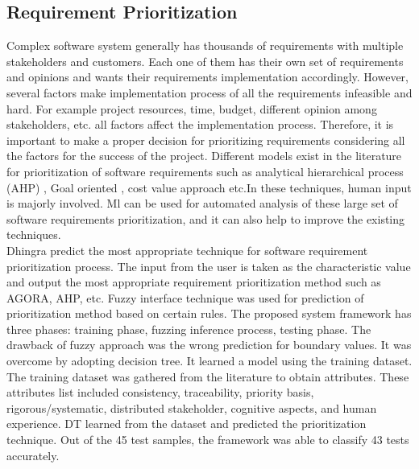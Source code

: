 \subsection{Requirement Prioritization}
Complex software system generally has thousands of requirements with multiple stakeholders and customers. Each one of them has their own set of requirements and opinions and wants their requirements implementation accordingly. However, several factors make implementation process of all the requirements infeasible and hard. For example project resources, time, budget, different opinion among stakeholders, etc. all factors affect the implementation process. Therefore, it is important to make a proper decision for prioritizing requirements considering all the factors for the success of the project. Different models exist in the literature for prioritization of software requirements such as analytical hierarchical process (AHP) \cite{saaty2008}, Goal oriented \cite{VanLamsweerde:2001}, cost value approach \cite{Karlsson:1997} etc.In these techniques, human input is majorly involved.  Ml can be used for automated analysis of these large set of software requirements prioritization, and it can also help to improve the existing techniques.\\

 Dhingra \etal  \cite{S. Dhingra } predict the most appropriate technique for software requirement prioritization process. The input from the user is taken as the characteristic value and output the most appropriate requirement prioritization method such as AGORA, AHP, etc. Fuzzy interface technique was used for prediction of prioritization method based on certain rules. The proposed system framework has three phases: training phase, fuzzing inference process, testing phase. The drawback of fuzzy approach was the wrong prediction for boundary values. It was overcome by adopting decision tree. It learned a model using the training dataset. The training dataset was gathered from the literature to obtain attributes. These attributes list included consistency,
traceability, priority basis, rigorous/systematic, distributed stakeholder,
cognitive aspects, and human experience.  DT learned from the dataset and predicted the prioritization technique. Out of the 45 test samples,
the framework was able to classify 43 tests accurately.

